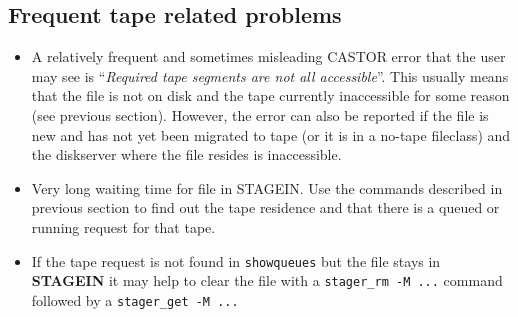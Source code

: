 \subsection{Frequent tape related problems}
\begin{itemize}
\item A relatively frequent and sometimes misleading CASTOR error that the user may see is
      ``{\em Required tape segments are not all accessible}''. This usually means that the file
      is not on disk and the tape currently inaccessible for some reason (see previous section).
      However, the error can also be reported if the file is new and has not yet been migrated
      to tape (or it is in a no-tape fileclass) and the diskserver where the file resides is
      inaccessible.
\item Very long waiting time for file in STAGEIN. Use the commands described in previous section
      to find out the tape residence and that there is a queued or running request for that tape.
\item If the tape request is not found in {\tt showqueues} but the file stays in {\bf STAGEIN}
      it may help to clear the file with a {\tt stager\_rm -M ...} command followed by a {\tt stager\_get -M ...}
\end{itemize}

